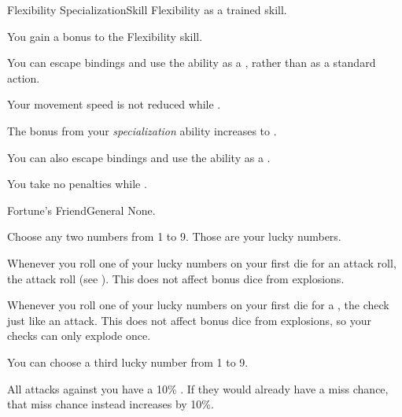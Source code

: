 


  \begin{feat}{Flexibility Specialization}{Skill}
    \featpre Flexibility as a trained skill.

     You gain a  bonus to the Flexibility skill.

     You can escape bindings and use the  ability as a , rather than as a standard action.

     Your movement speed is not reduced while \squeezing.

     The bonus from your \textit{specialization} ability increases to .

     You can also escape bindings and use the  ability as a .

     You take no penalties while \squeezing.
  \end{feat}

  \begin{feat}{Fortune's Friend}{General}
    \featpre None.

     Choose any two numbers from 1 to 9.
    Those are your lucky numbers.

     Whenever you roll one of your lucky numbers on your first die for an attack roll, the attack roll  (see ).
    This does not affect bonus dice from explosions.

     Whenever you roll one of your lucky numbers on your first die for a , the check  just like an attack.
    This does not affect bonus dice from explosions, so your checks can only explode once.

     You can choose a third lucky number from 1 to 9.

     All  attacks against you have a 10\% .
    If they would already have a miss chance, that miss chance instead increases by 10\%.
  \end{feat}

